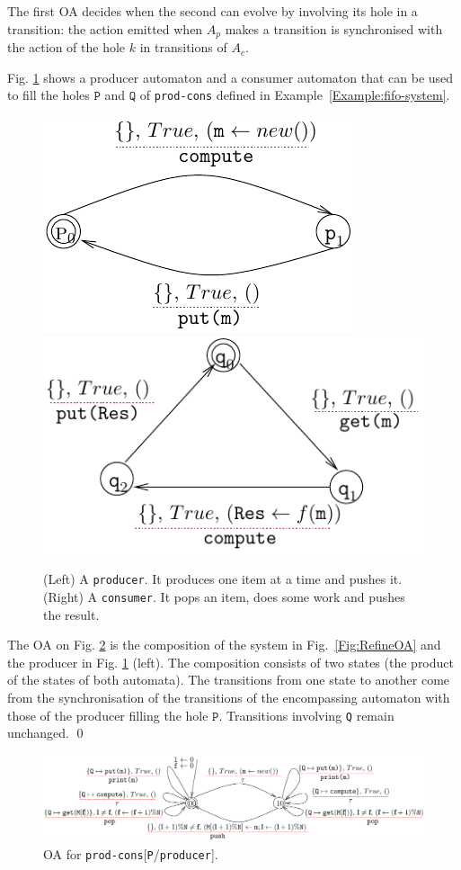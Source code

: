 \documentclass[runningheads]{llncs}
\begin{document}
The first OA decides when the second can evolve by involving its hole in a transition: the action emitted when \(A_p\) makes a transition is synchronised with the action of the hole \(k\) in transitions of \(A_c\).



\begin{example} \label{Example:prodandcons} Fig. \ref{Fig:procandcons} shows a producer automaton  and a consumer  automaton that can be used  to fill the holes $\texttt{P}$ and $\texttt{Q}$ of \texttt{prod-cons} defined in Example~\ref{Example:fifo-system}.
 \begin{figure}[!t]
 \centering
   \includegraphics[width=.35\textwidth]{Figures/P-proc.pdf}\hfill 
   \includegraphics[width=.45\textwidth]{Figures/Q-proc.pdf}
   \caption{(Left) A \texttt{producer}.  It produces one item at a time and pushes it.  (Right)  A \texttt{consumer}. It pops an item, does some work and pushes the result. \label{Fig:procandcons}}
\end{figure}



The OA on Fig. \ref{Fig:ComposeOA} is the composition of the system in Fig.~\ref{Fig:RefineOA} and the producer in Fig. \ref{Fig:procandcons} (left). The composition consists of two states (the product of the states of both automata). The transitions from one state to another come from  the synchronisation  of the transitions of the encompassing automaton with those of the producer filling the hole $\texttt{P}$. Transitions involving \texttt{Q} remain unchanged. \qed


\begin{figure}[!t]
 \centering
   \includegraphics[width=.99\textwidth]{Figures/compos-FIFO-Pro.pdf}
   \caption{OA for \texttt{prod-cons}[\texttt{P}/\texttt{producer}]. 
   \label{Fig:ComposeOA}} 
\end{figure}
\end{example}
\end{document}
